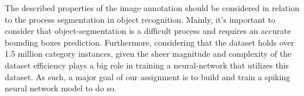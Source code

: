 The described properties of the image annotation should be considered in relation to the process segmentation in object recognition. Mainly, it’s important to consider that object-segmentation is a difficult process and requires an accurate bounding boxes prediction. Furthermore, considering that the dataset holds over 1.5 million category instances, given the sheer magnitude and complexity of the dataset efficiency plays a big role in training a neural-network that utilizes this dataset. As such, a major goal of our assignment is to build and train a spiking neural network model to do so.  
